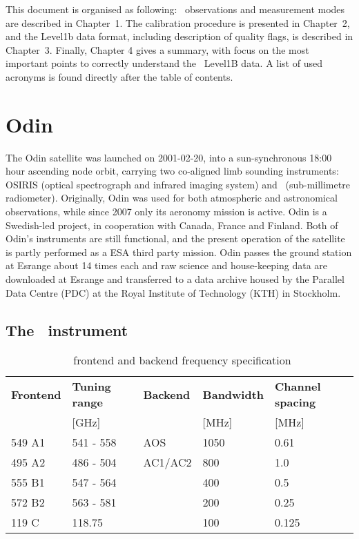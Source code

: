 This document is organised as following:
\smr\ observations and measurement modes are described 
in Chapter~1. The calibration procedure is presented in
Chapter~2, and the Level1b data format, including description
of quality flags, is described in Chapter~3.
Finally,
Chapter 4 gives a summary, with focus on the most important points to correctly
understand the \smr\ Level1B data. A list of used acronyms is found directly after
the table of contents.
   

\section{Odin}

The Odin satellite was launched on 2001-02-20, into a sun-synchronous
18:00 hour ascending node orbit, carrying two co-aligned limb sounding
instruments: OSIRIS (optical spectrograph and infrared imaging system) and
\SMR\ (sub-millimetre radiometer). Originally, Odin was used for both
atmospheric and astronomical observations, while since 2007 only its aeronomy
mission is active. Odin is a Swedish-led project, in cooperation with Canada,
France and Finland. Both of Odin's instruments are still functional, and the
present operation of the satellite is partly performed as a ESA third party
mission.
Odin passes the ground station at Esrange about 14 times each
and raw science and house-keeping data are downloaded at
Esrange and transferred to a data archive housed by the Parallel
Data Centre (PDC) at the Royal Institute of Technology (KTH)
in Stockholm.


\subsection{The \SMR\ instrument}


\begin{table}
\caption{ \smr\ frontend and backend frequency specification}
\label{table:config}
\begin{tabular}{|l|l|l|l|l|}
  \hline
  \textbf{Frontend} & \textbf{Tuning range} & \textbf{Backend} & \textbf{Bandwidth } & \textbf{Channel spacing} \\
                    & {[}GHz{]}             &                  & {[}MHz{]}           & {[}MHz{]}\\
  \hline
  549 A1            & 541 - 558             & AOS              & 1050                & 0.61\\
  \hline
  495 A2            & 486 - 504             & AC1/AC2          & 800                 & 1.0
 \\
 \cline{1-1}
 \cline{2-2}
 \cline{4-4}
 \cline{5-5}
  555 B1           & 547 - 564              &                 & 400                  & 0.5 \\
 \cline{1-1}
 \cline{2-2}
 \cline{4-4}
 \cline{5-5}
 572 B2            & 563 - 581              &                 & 200                  & 0.25 \\
 \cline{1-1}
 \cline{2-2}
 \cline{4-4}
 \cline{5-5}
  119 C           &  118.75                 &                 & 100                 & 0.125 \\
\hline
\end{tabular}
\end{table}

